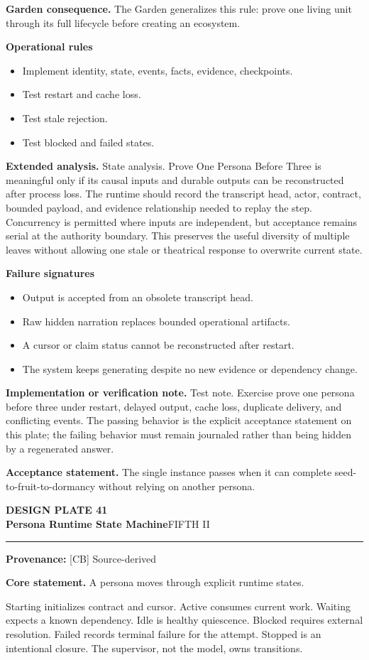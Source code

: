 \documentclass[10pt,letterpaper,oneside]{article}
\newcommand{\prov}[1]{\textcolor{gardenBlue}{\sffamily\footnotesize\textbf{Provenance:} #1}}
\newcommand{\platetitle}[3]{%
  \begin{minipage}[t][0.54in][t]{\textwidth}
  {\sffamily\bfseries\color{gardenDeep}\fontsize{9}{10}\selectfont DESIGN PLATE #1}\\[-1pt]
  {\sffamily\bfseries\color{gardenInk}\fontsize{16.5}{18}\selectfont #2}\hfill{\sffamily\color{gardenGreen}\large #3}
  \end{minipage}\vspace{-2pt}\hrule\vspace{5pt}}
\begin{document}
\textbf{Garden consequence.} The Garden generalizes this rule: prove one living unit through its full lifecycle before creating an ecosystem.

\textbf{Operational rules}
\begin{itemize}
\item Implement identity, state, events, facts, evidence, checkpoints.
\item Test restart and cache loss.
\item Test stale rejection.
\item Test blocked and failed states.
\end{itemize}
\textbf{Extended analysis.} State analysis. Prove One Persona Before Three is meaningful only if its causal inputs and durable outputs can be reconstructed after process loss. The runtime should record the transcript head, actor, contract, bounded payload, and evidence relationship needed to replay the step. Concurrency is permitted where inputs are independent, but acceptance remains serial at the authority boundary. This preserves the useful diversity of multiple leaves without allowing one stale or theatrical response to overwrite current state.

\textbf{Failure signatures}
\begin{itemize}
\item Output is accepted from an obsolete transcript head.
\item Raw hidden narration replaces bounded operational artifacts.
\item A cursor or claim status cannot be reconstructed after restart.
\item The system keeps generating despite no new evidence or dependency change.
\end{itemize}
\textbf{Implementation or verification note.} Test note. Exercise prove one persona before three under restart, delayed output, cache loss, duplicate delivery, and conflicting events. The passing behavior is the explicit acceptance statement on this plate; the failing behavior must remain journaled rather than being hidden by a regenerated answer.

\begin{acceptbox}
\textbf{Acceptance statement.} The single instance passes when it can complete seed-to-fruit-to-dormancy without relying on another persona.
\end{acceptbox}
\newpage
\platetitle{41}{Persona Runtime State Machine}{FIFTH II}
\prov{[CB] Source-derived}
\fontsize{8.85}{10.45}\selectfont
\begin{corebox}
\textbf{Core statement.} A persona moves through explicit runtime states.
\end{corebox}
Starting initializes contract and cursor. Active consumes current work. Waiting expects a known dependency. Idle is healthy quiescence. Blocked requires external resolution. Failed records terminal failure for the attempt. Stopped is an intentional closure. The supervisor, not the model, owns transitions.
\end{document}
